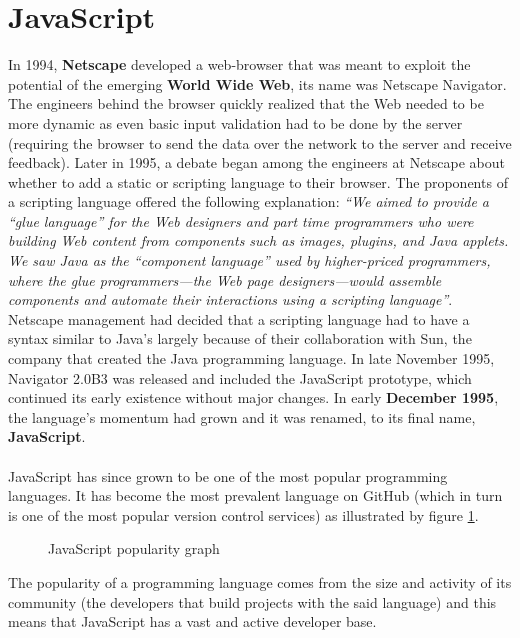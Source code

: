 \documentclass{l4proj}
\begin{document}
\section{JavaScript}
\hspace*{1em} In 1994, \textbf{Netscape} developed a web-browser that was meant to exploit the potential of the emerging \textbf{World Wide Web}, its name was Netscape Navigator. The engineers behind the browser quickly realized that the Web needed to be more dynamic as even basic input validation had to be done by the server (requiring the browser to send the data over the network to the server and receive feedback). Later in 1995, a debate began among the engineers at Netscape about whether to add a static or scripting language to their browser. The proponents of a scripting language offered the following explanation: 
\textit{``We aimed to provide a “glue language” for the Web designers and part time programmers who were building Web content from components such as images, plugins, and Java applets. We saw Java as the “component language” used by higher-priced programmers, where the glue programmers—the Web page designers—would assemble components and automate their interactions using a scripting language''}\cite{jsgrandpa}.
Netscape management had decided that a scripting language had to have a syntax similar to Java’s largely because of their collaboration with Sun, the company that created the Java programming language. In late November 1995, Navigator 2.0B3 was released and included the JavaScript prototype, which continued its early existence without major changes. In early \textbf{December 1995}, the language's momentum had grown and it was renamed, to its final name, \textbf{JavaScript}\cite{jsdaddy}.
\\\\
\hspace*{1em} JavaScript has since grown to be one of the most popular programming languages. It has become the most prevalent language on  GitHub\cite{github} (which in turn is one of the most popular version control services) as illustrated by figure \ref{jspop}.

\begin{figure}[!ht]
\centering
{}
\caption{JavaScript popularity graph}
\label{jspop}
\end{figure}

The popularity of a programming language comes from the size and activity of its community (the developers that build projects with the said language) and this means that JavaScript has a vast and active developer base.
\end{document}
